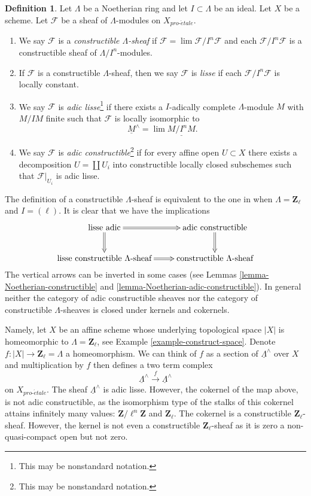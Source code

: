 \documentclass{stacks-project}
\theoremstyle{plain}
\theoremstyle{definition}
\newtheorem{definition}[subsection]{Definition}
\theoremstyle{remark}
\numberwithin{equation}{subsection}
\def\lim{\mathop{\mathrm{lim}}\nolimits}
\def\proetale{{pro\text{-}\acute{e}tale}}
\begin{document}
\begin{definition}
\label{definition-adic}
Let $\Lambda$ be a Noetherian ring and let $I \subset \Lambda$ be an ideal.
Let $X$ be a scheme. Let $\mathcal{F}$ be a sheaf of $\Lambda$-modules
on $X_\proetale$.
\begin{enumerate}
\item We say $\mathcal{F}$ is a {\it constructible $\Lambda$-sheaf}
if $\mathcal{F} = \lim \mathcal{F}/I^n\mathcal{F}$ and each
$\mathcal{F}/I^n\mathcal{F}$ is a constructible sheaf of $\Lambda/I^n$-modules.
\item If $\mathcal{F}$ is a constructible $\Lambda$-sheaf, then we say
$\mathcal{F}$ is {\it lisse} if each $\mathcal{F}/I^n\mathcal{F}$ is
locally constant.
\item We say $\mathcal{F}$ is {\it adic lisse}\footnote{This may
be nonstandard notation.} if there exists a
$I$-adically complete $\Lambda$-module $M$ with $M/IM$ finite
such that $\mathcal{F}$ is locally isomorphic to
$$
\underline{M}^\wedge = \lim \underline{M/I^nM}.
$$
\item We say $\mathcal{F}$ is
{\it adic constructible}\footnote{This may be nonstandard notation.}
if for every affine open $U \subset X$
there exists a decomposition $U = \coprod U_i$ into
constructible locally closed subschemes such that $\mathcal{F}|_{U_i}$
is adic lisse.
\end{enumerate}
\end{definition}

\noindent
The definition of a constructible $\Lambda$-sheaf is equivalent
to the one in \cite[Expos\'e VI, Definition 1.1.1]{SGA5} when
$\Lambda = \mathbf{Z}_\ell$ and $I = (\ell)$. It is clear that
we have the implications
$$
\xymatrix{
\text{lisse adic} \ar@{=>}[r] \ar@{=>}[d] &
\text{adic constructible} \ar@{=>}[d] \\
\text{lisse constructible }\Lambda\text{-sheaf} \ar@{=>}[r] &
\text{constructible }\Lambda\text{-sheaf}
}
$$
The vertical arrows can be inverted in some cases
(see Lemmas \ref{lemma-Noetherian-constructible} and
\ref{lemma-Noetherian-adic-constructible}). In general
neither the category of adic constructible sheaves nor
the category of constructible $\Lambda$-sheaves is closed
under kernels and cokernels.

\medskip\noindent
Namely, let $X$ be an affine scheme whose underlying topological space $|X|$
is homeomorphic to $\Lambda = \mathbf{Z}_\ell$, see
Example \ref{example-construct-space}. Denote
$f : |X| \to \mathbf{Z}_\ell = \Lambda$
a homeomorphism. We can think of $f$ as a section of
$\underline{\Lambda}^\wedge$ over $X$ and multiplication by $f$
then defines a two term complex
$$
\underline{\Lambda}^\wedge \xrightarrow{f} \underline{\Lambda}^\wedge
$$
on $X_\proetale$. The sheaf $\underline{\Lambda}^\wedge$ is adic lisse.
However, the cokernel of the map above, is not adic constructible, as
the isomorphism type of the stalks of this cokernel attains infinitely
many values: $\mathbf{Z}/\ell^n\mathbf{Z}$ and $\mathbf{Z}_\ell$.
The cokernel is a constructible $\mathbf{Z}_\ell$-sheaf.
However, the kernel is not even a constructible $\mathbf{Z}_\ell$-sheaf
as it is zero a non-quasi-compact open but not zero.
\end{document}
